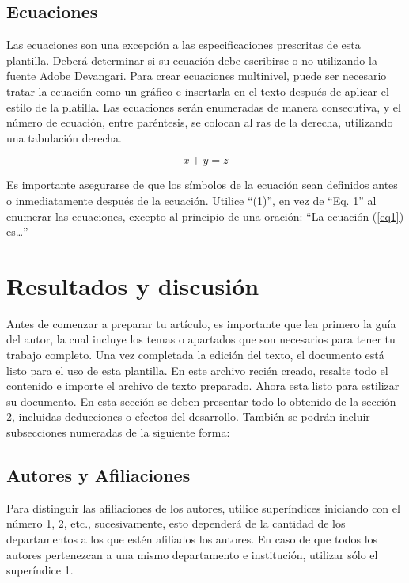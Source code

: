     \subsection{Ecuaciones}
    
    Las ecuaciones son una excepción a las especificaciones prescritas de esta plantilla. 
    Deberá determinar si su ecuación debe escribirse o no utilizando la fuente Adobe Devangari. 
    Para crear ecuaciones multinivel, puede ser necesario tratar la ecuación como un gráfico e insertarla en el texto después de aplicar el estilo de la platilla.
    Las ecuaciones serán enumeradas de manera consecutiva, y el número de ecuación, entre paréntesis, se colocan al ras de la derecha, utilizando una tabulación derecha. 
    
    \begin{equation}
        \label{eq1}
        x + y = z 
    \end{equation}
    
    Es importante asegurarse de que los símbolos de la ecuación sean definidos antes o inmediatamente después de la ecuación. Utilice “(1)”, en vez de “Eq. 1” al enumerar las ecuaciones, excepto al principio de una oración: “La ecuación (\ref{eq1}) es…”
    
    \section{Resultados y discusión}
    
    Antes de comenzar a preparar tu artículo, es importante que lea primero la guía del autor, la cual incluye los temas o apartados que son necesarios para tener tu trabajo completo.
    Una vez completada la edición del texto, el documento está listo para el uso de esta plantilla. En este archivo recién creado, resalte todo el contenido e importe el archivo de texto preparado. Ahora esta listo para estilizar su documento.
    En esta sección se deben presentar todo lo obtenido de la sección 2, incluidas deducciones o efectos del desarrollo. También se podrán incluir subsecciones numeradas de la siguiente forma:
    
    \subsection{Autores y Afiliaciones}
    
    Para distinguir las afiliaciones de los autores, utilice superíndices iniciando con el número 1, 2, etc., sucesivamente, esto dependerá de la cantidad de los departamentos a los que estén afiliados los autores. En caso de que todos los autores pertenezcan a una mismo departamento e institución, utilizar sólo el superíndice 1. 
    
